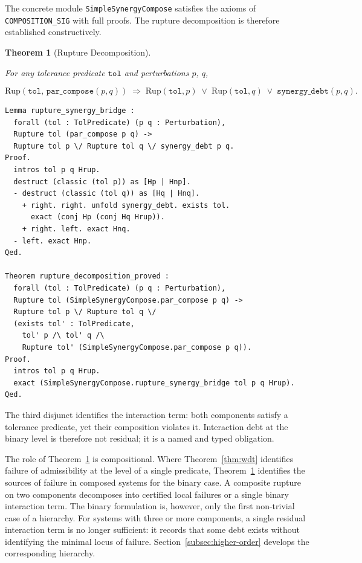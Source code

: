 \documentclass[12pt]{article}
\theoremstyle{plain}
\newtheorem{theorem}{Theorem}[section]
\theoremstyle{definition}
\theoremstyle{remark}
\begin{document}
The concrete module \texttt{SimpleSynergyCompose} satisfies the axioms
of \texttt{COMPOSITION\_SIG} with full proofs.
The rupture decomposition is therefore established constructively.

\begin{theorem}[Rupture Decomposition]
\label{thm:rupture}

For any tolerance predicate $\mathtt{tol}$ and perturbations $p$, $q$,

\[
\mathrm{Rup}(\mathtt{tol},\, \mathtt{par\_compose}(p,q))
\;\Rightarrow\;
\mathrm{Rup}(\mathtt{tol}, p)
\;\vee\;
\mathrm{Rup}(\mathtt{tol}, q)
\;\vee\;
\mathtt{synergy\_debt}(p, q).
\]

\end{theorem}

\begin{lstlisting}[style=rocq,
caption={Proved rupture decomposition.}]
Lemma rupture_synergy_bridge :
  forall (tol : TolPredicate) (p q : Perturbation),
  Rupture tol (par_compose p q) ->
  Rupture tol p \/ Rupture tol q \/ synergy_debt p q.
Proof.
  intros tol p q Hrup.
  destruct (classic (tol p)) as [Hp | Hnp].
  - destruct (classic (tol q)) as [Hq | Hnq].
    + right. right. unfold synergy_debt. exists tol.
      exact (conj Hp (conj Hq Hrup)).
    + right. left. exact Hnq.
  - left. exact Hnp.
Qed.

Theorem rupture_decomposition_proved :
  forall (tol : TolPredicate) (p q : Perturbation),
  Rupture tol (SimpleSynergyCompose.par_compose p q) ->
  Rupture tol p \/ Rupture tol q \/
  (exists tol' : TolPredicate,
    tol' p /\ tol' q /\
    Rupture tol' (SimpleSynergyCompose.par_compose p q)).
Proof.
  intros tol p q Hrup.
  exact (SimpleSynergyCompose.rupture_synergy_bridge tol p q Hrup).
Qed.
\end{lstlisting}

The third disjunct identifies the interaction term: both components
satisfy a tolerance predicate, yet their composition violates it.
Interaction debt at the binary level is therefore not residual; it is
a named and typed obligation.

The role of Theorem~\ref{thm:rupture} is compositional.
Where Theorem~\ref{thm:wdt} identifies failure of admissibility at the
level of a single predicate, Theorem~\ref{thm:rupture} identifies the
sources of failure in composed systems for the binary case.
A composite rupture on two components decomposes into certified local
failures or a single binary interaction term.
The binary formulation is, however, only the first non-trivial case of
a hierarchy.
For systems with three or more components, a single residual
interaction term is no longer sufficient: it records that some debt
exists without identifying the minimal locus of failure.
Section~\ref{subsec:higher-order} develops the corresponding hierarchy.
\end{document}
